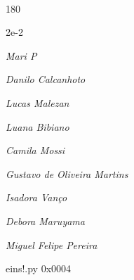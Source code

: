 \documentclass[12pt]{article}
\begin{document}
	\hfill	  	  


\pagebreak			

	\ 
	\vfill
	\begin{turn}{180}	
		\begin{minipage}{\textwidth}
		  	\ttfamily %
			\centering
			{\Huge 2e-2}
		  
			\hfill
		  
			

\textit{\small Mari P}

\textit{\small Danilo Calcanhoto}

\textit{\small Lucas Malezan}

\textit{\small Luana Bibiano}

\textit{\small Camila Mossi}

\textit{\small Gustavo de Oliveira Martins}

\textit{\small Isadora Vanço}

\textit{\small Debora Maruyama}

\textit{\small Miguel Felipe Pereira}

\bigskip

eins!.py
0x0004


		\end{minipage}	
	\end{turn}
	\vfill
	\

\pagebreak
\end{document}
